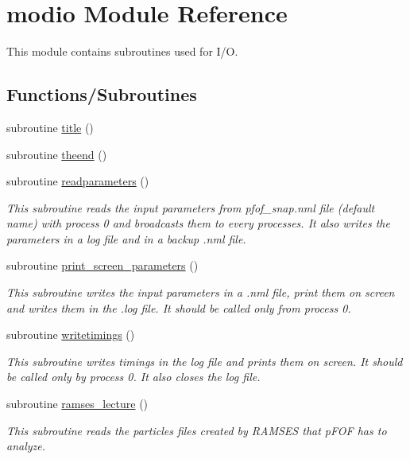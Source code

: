 \hypertarget{namespacemodio}{}\section{modio Module Reference}
\label{namespacemodio}


This module contains subroutines used for I/O.  


\subsection*{Functions/\+Subroutines}
\begin{DoxyCompactItemize}
\item 
subroutine \hyperlink{namespacemodio_aefab9476e94da81a75351dbeee74e623}{title} ()
\item 
subroutine \hyperlink{namespacemodio_a2688770b2d08498c14ef3212e61d74bf}{theend} ()
\item 
subroutine \hyperlink{namespacemodio_aa5e6b5f45cf8cfc091e8e7ff25a97c68}{readparameters} ()
\begin{DoxyCompactList}\small\item\em This subroutine reads the input parameters from pfof\+\_\+snap.\+nml file (default name) with process 0 and broadcasts them to every processes. It also writes the parameters in a log file and in a backup .nml file. \end{DoxyCompactList}\item 
subroutine \hyperlink{namespacemodio_a19a738d75d352c974bb25823da81e3d7}{print\+\_\+screen\+\_\+parameters} ()
\begin{DoxyCompactList}\small\item\em This subroutine writes the input parameters in a .nml file, print them on screen and writes them in the .log file. It should be called only from process 0. \end{DoxyCompactList}\item 
subroutine \hyperlink{namespacemodio_a6ba64be35b401e31cd35f96ea50bb0c4}{writetimings} ()
\begin{DoxyCompactList}\small\item\em This subroutine writes timings in the log file and prints them on screen. It should be called only by process 0. It also closes the log file. \end{DoxyCompactList}\item 
subroutine \hyperlink{namespacemodio_a7bb73858f091ddd46631bcb29022f803}{ramses\+\_\+lecture} ()
\begin{DoxyCompactList}\small\item\em This subroutine reads the particles files created by R\+A\+M\+S\+ES that p\+F\+OF has to analyze. \end{DoxyCompactList}\item 

\end{DoxyCompactItemize}
